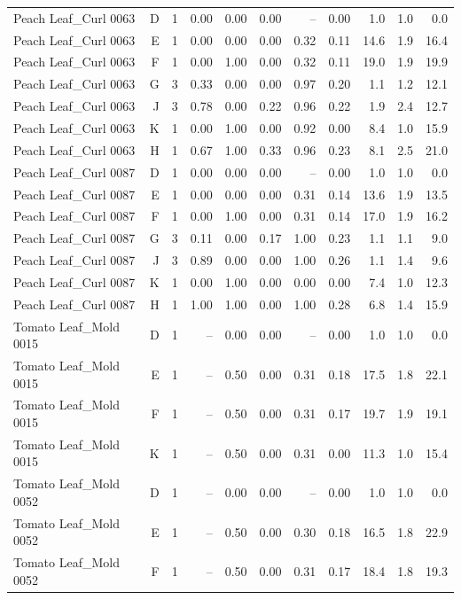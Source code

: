 \begin{table}[H]
{\begin{tabular}{lrrrrrrrrrr}
Peach Leaf\_Curl 0063 & D & 1 & 0.00 & 0.00 & 0.00 & -- & 0.00 & 1.0 & 1.0 & 0.0 \\
Peach Leaf\_Curl 0063 & E & 1 & 0.00 & 0.00 & 0.00 & 0.32 & 0.11 & 14.6 & 1.9 & 16.4 \\
Peach Leaf\_Curl 0063 & F & 1 & 0.00 & 1.00 & 0.00 & 0.32 & 0.11 & 19.0 & 1.9 & 19.9 \\
Peach Leaf\_Curl 0063 & G & 3 & 0.33 & 0.00 & 0.00 & 0.97 & 0.20 & 1.1 & 1.2 & 12.1 \\
Peach Leaf\_Curl 0063 & J & 3 & 0.78 & 0.00 & 0.22 & 0.96 & 0.22 & 1.9 & 2.4 & 12.7 \\
Peach Leaf\_Curl 0063 & K & 1 & 0.00 & 1.00 & 0.00 & 0.92 & 0.00 & 8.4 & 1.0 & 15.9 \\
Peach Leaf\_Curl 0063 & H & 1 & 0.67 & 1.00 & 0.33 & 0.96 & 0.23 & 8.1 & 2.5 & 21.0 \\
Peach Leaf\_Curl 0087 & D & 1 & 0.00 & 0.00 & 0.00 & -- & 0.00 & 1.0 & 1.0 & 0.0 \\
Peach Leaf\_Curl 0087 & E & 1 & 0.00 & 0.00 & 0.00 & 0.31 & 0.14 & 13.6 & 1.9 & 13.5 \\
Peach Leaf\_Curl 0087 & F & 1 & 0.00 & 1.00 & 0.00 & 0.31 & 0.14 & 17.0 & 1.9 & 16.2 \\
Peach Leaf\_Curl 0087 & G & 3 & 0.11 & 0.00 & 0.17 & 1.00 & 0.23 & 1.1 & 1.1 & 9.0 \\
Peach Leaf\_Curl 0087 & J & 3 & 0.89 & 0.00 & 0.00 & 1.00 & 0.26 & 1.1 & 1.4 & 9.6 \\
Peach Leaf\_Curl 0087 & K & 1 & 0.00 & 1.00 & 0.00 & 0.00 & 0.00 & 7.4 & 1.0 & 12.3 \\
Peach Leaf\_Curl 0087 & H & 1 & 1.00 & 1.00 & 0.00 & 1.00 & 0.28 & 6.8 & 1.4 & 15.9 \\
Tomato Leaf\_Mold 0015 & D & 1 & -- & 0.00 & 0.00 & -- & 0.00 & 1.0 & 1.0 & 0.0 \\
Tomato Leaf\_Mold 0015 & E & 1 & -- & 0.50 & 0.00 & 0.31 & 0.18 & 17.5 & 1.8 & 22.1 \\
Tomato Leaf\_Mold 0015 & F & 1 & -- & 0.50 & 0.00 & 0.31 & 0.17 & 19.7 & 1.9 & 19.1 \\
Tomato Leaf\_Mold 0015 & K & 1 & -- & 0.50 & 0.00 & 0.31 & 0.00 & 11.3 & 1.0 & 15.4 \\
Tomato Leaf\_Mold 0052 & D & 1 & -- & 0.00 & 0.00 & -- & 0.00 & 1.0 & 1.0 & 0.0 \\
Tomato Leaf\_Mold 0052 & E & 1 & -- & 0.50 & 0.00 & 0.30 & 0.18 & 16.5 & 1.8 & 22.9 \\
Tomato Leaf\_Mold 0052 & F & 1 & -- & 0.50 & 0.00 & 0.31 & 0.17 & 18.4 & 1.8 & 19.3 \\

\end{tabular}}
\end{table}
